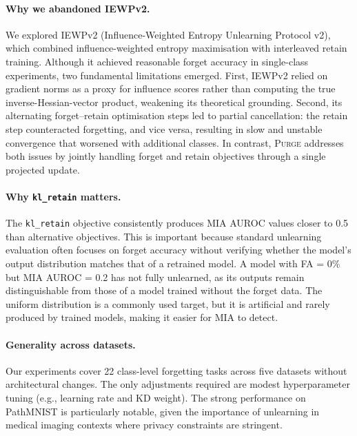 \documentclass[10pt,twocolumn]{article}
\newcommand{\ours}{\textsc{Purge}}
\newcommand{\klr}{\texttt{kl\_retain}}
\begin{document}
\paragraph{Why we abandoned IEWPv2.}
We explored IEWPv2 (Influence-Weighted Entropy Unlearning Protocol v2), which combined influence-weighted entropy maximisation with interleaved retain training.
Although it achieved reasonable forget accuracy in single-class experiments, two fundamental limitations emerged.
First, IEWPv2 relied on gradient norms as a proxy for influence scores rather than computing the true inverse-Hessian-vector product, weakening its theoretical grounding.
Second, its alternating forget--retain optimisation steps led to partial cancellation: the retain step counteracted forgetting, and vice versa, resulting in slow and unstable convergence that worsened with additional classes.
In contrast, \ours{} addresses both issues by jointly handling forget and retain objectives through a single projected update.

\paragraph{Why \klr{} matters.}
The \klr{} objective consistently produces MIA AUROC values closer to 0.5 than alternative objectives.
This is important because standard unlearning evaluation often focuses on forget accuracy without verifying whether the model's output distribution matches that of a retrained model.
A model with FA = 0\% but MIA AUROC = 0.2 has not fully unlearned, as its outputs remain distinguishable from those of a model trained without the forget data.
The uniform distribution is a commonly used target, but it is artificial and rarely produced by trained models, making it easier for MIA to detect.

\paragraph{Generality across datasets.}
Our experiments cover 22 class-level forgetting tasks across five datasets without architectural changes.
The only adjustments required are modest hyperparameter tuning (e.g., learning rate and KD weight).
The strong performance on PathMNIST is particularly notable, given the importance of unlearning in medical imaging contexts where privacy constraints are stringent.
\end{document}
